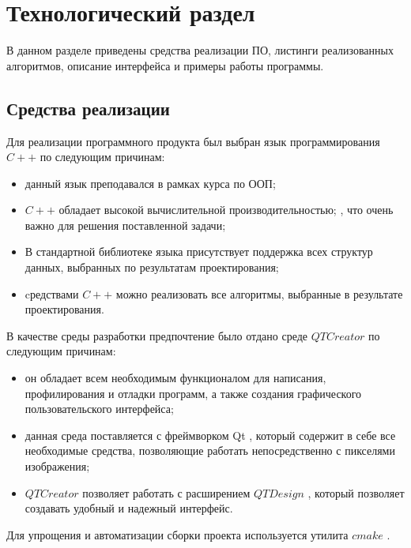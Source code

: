 \chapter{Технологический раздел}


В данном разделе приведены средства реализации ПО, листинги реализованных алгоритмов, описание интерфейса и примеры работы программы.

\section{Средства реализации}

Для реализации программного продукта был выбран язык программирования $C++$ \cite{info_pl} по следующим причинам:

\begin{itemize}[label*=--]
	\item данный язык преподавался в рамках курса по ООП;
	\item $C++$ обладает высокой вычислительной производительностью; \cite{info_cmpCplplPy, info_cmpCplplJava}, что очень важно для решения поставленной задачи;
	\item В стандартной библиотеке языка присутствует поддержка всех
	структур данных, выбранных по результатам проектирования;
	\item cредствами $C++$ можно реализовать все алгоритмы, выбранные в результате проектирования.
\end{itemize}

В качестве среды разработки предпочтение было отдано среде $QTCreator$ \cite{info_QtCr} по следующим причинам:

\begin{itemize}[label*=---]
	\item он обладает всем необходимым функционалом для написания, профилирования и
	отладки программ, а также создания графического пользовательского интерфейса;
	\item данная среда поставляется с фреймворком Qt \cite{info_QtDoc}, который содержит в себе все необходимые средства, позволяющие работать непосредственно с
	пикселями изображения;
	\item $QTCreator$ позволяет работать с расширением $QT Design$ \cite{info_QtDes}, который позволяет создавать удобный и надежный интерфейс.
\end{itemize}

Для упрощения и автоматизации сборки проекта используется утилита $cmake$ \cite{info_Cmake}.


